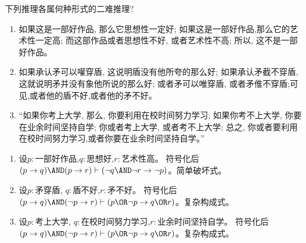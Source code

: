 \documentclass{ctexart}
\begin{document}
\begin{problem}\label{pro:3}
  下列推理各属何种形式的二难推理?
  \begin{enumerate}
    \item 如果这是一部好作品, 那么它思想性一定好; 如果这是一部好作品,那么它的艺术性一定高; 而这部作品或者思想性不好, 或者艺术性不高; 所以, 这不是一部好作品。
    \item 如果承认矛可以嚾穿盾, 这说明盾没有他所夸的那么好; 如果承认矛截不穿盾, 这就说明矛并没有象他所说的那么好; 或者矛可以唯穿盾, 或者矛倠不穿盾;可见,或者他的盾不好,或者他的矛不好。
    \item “如果你考上大学, 那么, 你要利用在校时间努力学习; 如果你考不上大学, 你要在业余时间坚持自学; 你或者考上大学, 或者考不上大学; 总之, 你或者要利用在校时间努力学习,或者你要在业余时间坚持自学。”
  \end{enumerate}
\end{problem}
\begin{solution}
  \begin{enumerate}
    \item 设\(p:\text{一部好作品}\),\(q:\text{思想好}\),\(r:\text{艺术性高}\)。
      符号化后\((p \to q)\AND (p \to r) \vdash (\neg q \AND \neg r \to \neg p)\)。简单破坏式。
    \item 设\(p : \text{矛穿盾}\), \(q :\text{盾不好}\),\(r:\text{矛不好}\)。
      符号化后\((p \to q)\AND (\neg p \to r) \vdash ( p \OR \neg p \to q \OR r )\)。复杂构成式。
    \item 设\(p:\text{考上大学}\), \(q:\text{在校时间努力学习}\),\(r:\text{业余时间坚持自学}\)。
      符号化后\((p \to q)\AND (\neg p \to r) \vdash ( p \OR \neg p \to q \OR r )\)。复杂构成式。
  \end{enumerate}

\end{solution}
\end{document}
